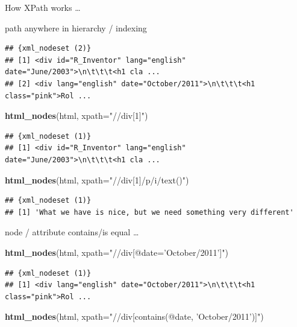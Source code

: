 \documentclass[ignorenonframetext,]{beamer}
\newenvironment{Shaded}{\begin{snugshade}}{\end{snugshade}}
\newcommand{\KeywordTok}[1]{\textcolor[rgb]{0.13,0.29,0.53}{\textbf{{#1}}}}
\newcommand{\DataTypeTok}[1]{\textcolor[rgb]{0.13,0.29,0.53}{{#1}}}
\newcommand{\StringTok}[1]{\textcolor[rgb]{0.31,0.60,0.02}{{#1}}}
\newcommand{\NormalTok}[1]{{#1}}
\begin{document}
\begin{frame}[fragile]{How XPath works \ldots{}}
\begin{block}{path anywhere in hierarchy / indexing}
\begin{verbatim}
## {xml_nodeset (2)}
## [1] <div id="R_Inventor" lang="english" date="June/2003">\n\t\t\t<h1 cla ...
## [2] <div lang="english" date="October/2011">\n\t\t\t<h1 class="pink">Rol ...
\end{verbatim}

\begin{Shaded}
\begin{Highlighting}[]
\KeywordTok{html_nodes}\NormalTok{(html, }\DataTypeTok{xpath=}\StringTok{"//div[1]"}\NormalTok{)}
\end{Highlighting}
\end{Shaded}

\begin{verbatim}
## {xml_nodeset (1)}
## [1] <div id="R_Inventor" lang="english" date="June/2003">\n\t\t\t<h1 cla ...
\end{verbatim}

\begin{Shaded}
\begin{Highlighting}[]
\KeywordTok{html_nodes}\NormalTok{(html, }\DataTypeTok{xpath=}\StringTok{"//div[1]/p/i/text()"}\NormalTok{)}
\end{Highlighting}
\end{Shaded}

\begin{verbatim}
## {xml_nodeset (1)}
## [1] 'What we have is nice, but we need something very different'
\end{verbatim}

\end{block}

\begin{block}{node / attribute contains/is equal \ldots{}}

\begin{Shaded}
\begin{Highlighting}[]
\KeywordTok{html_nodes}\NormalTok{(html, }\DataTypeTok{xpath=}\StringTok{"//div[@date='October/2011']"}\NormalTok{)}
\end{Highlighting}
\end{Shaded}

\begin{verbatim}
## {xml_nodeset (1)}
## [1] <div lang="english" date="October/2011">\n\t\t\t<h1 class="pink">Rol ...
\end{verbatim}

\begin{Shaded}
\begin{Highlighting}[]
\KeywordTok{html_nodes}\NormalTok{(html, }\DataTypeTok{xpath=}\StringTok{"//div[contains(@date, 'October/2011')]"}\NormalTok{)}
\end{Highlighting}
\end{Shaded}


\end{block}
\end{frame}
\end{document}
